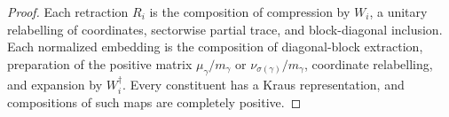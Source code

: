\begin{proof}\leanok
    Each retraction $R_i$ is the composition of compression by $W_i$, a unitary
    relabelling of coordinates, sectorwise partial trace, and block-diagonal
    inclusion.  Each normalized embedding is the composition of diagonal-block
    extraction, preparation of the positive matrix
    $\mu_\gamma/m_\gamma$ or
    $\nu_{\sigma(\gamma)}/m_\gamma$, coordinate relabelling, and expansion by
    $W_i^\dagger$.  Every constituent has a Kraus representation, and
    compositions of such maps are completely positive.
\end{proof}

